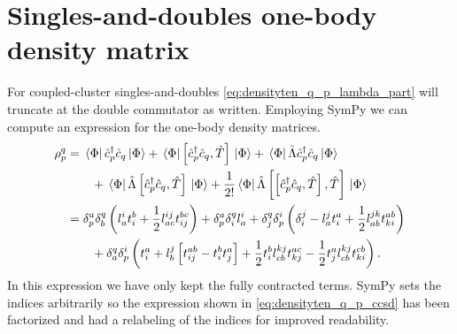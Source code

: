     \section{Singles-and-doubles one-body density matrix}
        For coupled-cluster singles-and-doubles \autoref{eq:densityten_q_p_lambda_part}
        will truncate at the double commutator as written. Employing
        SymPy\cite{sympy} we can compute an expression for the one-body density
        matrices.
        \begin{align}
            \rho^{q}_{p}
            &= \bra*{\Phi}\hat{c}_{p}^{\dagger}\hat{c}_{q}\ket*{\Phi}
            + \bra*{\Phi}\left[\hat{c}_{p}^{\dagger}\hat{c}_{q}, \hat{T}\right]\ket*{\Phi}
            + \bra*{\Phi}\hat{\Lambda} \hat{c}_{p}^{\dagger}\hat{c}_{q}\ket*{\Phi}
            \nonumber \\
            &\qquad
            + \bra*{\Phi}\hat{\Lambda} \left[\hat{c}_{p}^{\dagger}\hat{c}_{q}, \hat{T}\right]\ket*{\Phi}
            + \frac{1}{2!}
            \bra*{\Phi}\hat{\Lambda} \left[\left[\hat{c}_{p}^{\dagger}\hat{c}_{q}, \hat{T}\right], \hat{T}\right]\ket*{\Phi}
            \\
            &=
            \delta^a_p \delta^q_b \left( 
                l^i_a t^b_i + \frac{1}{2} l^{ij}_{ac} t^{bc}_{ij}
             \right)
            + \delta^a_p \delta^q_i l^i_a
            + \delta^q_j \delta^i_p \left( 
                \delta^j_i
                - l^j_a t^a_i
                + \frac{1}{2} l^{jk}_{ab} t^{ab}_{ki}
             \right)
            \nonumber \\
            &\qquad
            + \delta^q_a \delta^i_p \left( 
                t^a_i
                + l^j_b \left[ 
                    t^{ab}_{ij} - t^b_i t^a_j
                 \right]
                + \frac{1}{2} t^{b}_{i} l^{kj}_{cb} t^{ac}_{kj}
                - \frac{1}{2} t^{a}_{j} l^{kj}_{cb} t^{cb}_{ki}
             \right).
            \label{eq:densityten_q_p_ccsd}
        \end{align}
        In this expression we have only kept the fully contracted terms. SymPy
        sets the indices arbitrarily so the expression shown in
        \autoref{eq:densityten_q_p_ccsd} has been factorized and had a relabeling of
        the indices for improved readability.
